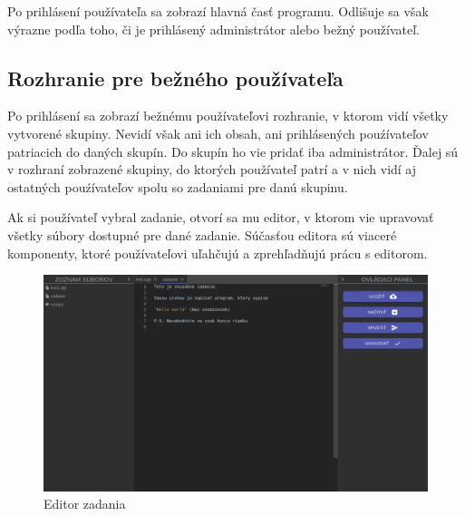 Po prihlásení používateľa sa zobrazí hlavná časť programu. Odlišuje sa však výrazne podľa toho, či
je prihlásený administrátor alebo bežný používateľ.

\subsection{Rozhranie pre bežného používateľa}
Po prihlásení sa zobrazí bežnému používateľovi rozhranie, v ktorom vidí všetky vytvorené skupiny.
Nevidí však ani ich obsah, ani prihlásených pouźívateľov patriacich do daných skupín. Do skupín
ho vie pridať iba administrátor. Ďalej sú v rozhraní zobrazené skupiny, do ktorých používateľ patrí
a v nich vidí aj ostatných pouźívateľov spolu so zadaniami pre danú skupinu.

Ak si používateľ vybral zadanie, otvorí sa mu editor, v ktorom vie upravovať všetky súbory dostupné
pre dané zadanie. Súčasťou editora sú viaceré komponenty, ktoré používateľovi uľahčujú a
zprehľadňujú prácu s editorom. 
\begin{figure}[H]
\centerline{\includegraphics[width=1\textwidth]{images/bezny_pouzivatel}}
\caption[Editor zadania]{Editor zadania}
\label{obr:bezny_pouzivatel}
\end{figure}

